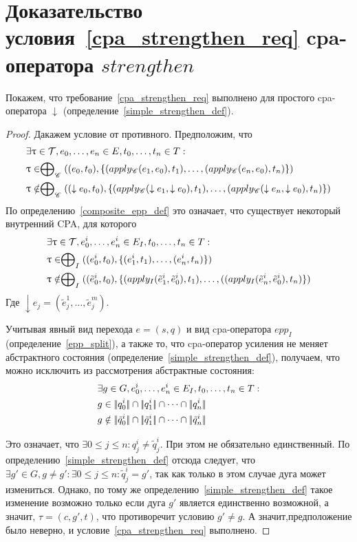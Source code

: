 \section{Доказательство условия~\ref{cpa_strengthen_req} cpa-оператора $strengthen$}
\label{sect_composite_strengthen_proof}

Покажем, что требование~\ref{cpa_strengthen_req} выполнено для простого cpa-оператора $\downarrow$ (определение~\ref{simple_strengthen_def}).

\begin{proof}
Дакажем условие от противного.
Предположим, что 
\begin{align*}
& \exists \uptau \in \mathcal{T}, e_0, \dots, e_n \in E, t_0, \dots, t_n \in T : \\
& \uptau \in \mathrel{\bigoplus}_{\mathscr{C}}((e_0, t_0), \{(apply_{\mathscr{C}}(e_1, e_0), t_1), \dots, (apply_{\mathscr{C}}(e_n, e_0), t_n)\}) \\
& \uptau \notin \mathrel{\bigoplus}_{\mathscr{C}}((\downarrow e_0, t_0), \{(apply_{\mathscr{C}}(\downarrow e_1, \downarrow e_0), t_1), \dots, (apply_{\mathscr{C}}(\downarrow e_n, \downarrow e_0), t_n)\}) 
\end{align*}
По определению~\ref{composite_epp_def} это означает, что существует некоторый внутренний CPA, для которого 
\begin{align*}
& \exists \uptau \in \mathcal{T}, e^i_0, \dots, e^i_n \in E_I, t_0, \dots, t_n \in T : \\
& \uptau \in \mathrel{\bigoplus}_{I}((e^i_0, t_0), \{(e^i_1, t_1), \dots, (e^i_n, t_n)\}) \\
& \uptau \notin \mathrel{\bigoplus}_{I}((\tilde{e}^i_0, t_0), \{(apply_{I}(\tilde{e}^i_1, \tilde{e}^i_0), t_1), \dots, ((apply_{I}(\tilde{e}^i_n, \tilde{e}^i_0), t_n)\}) 
\end{align*}
Где $\downarrow e_j = (\tilde{e}^1_j, \dots, \tilde{e}^m_j)$.

Учитывая явный вид перехода $e=(s,q)$ и вид cpa-оператора $epp_I$(определение~\ref{epp_split}), а также то, что cpa-оператор усиления не меняет абстрактного состояния (определение~\ref{simple_strengthen_def}), получаем, что можно исключить из рассмотрения абстрактные состояния:
\begin{align*}
& \exists g \in G, e^i_0, \dots, e^i_n \in E_I, t_0, \dots, t_n \in T : \\
& g \in \econc{q^i_0} \cap \econc{q^i_1} \cap \dots \cap \econc{q^i_n} \\
& g \notin \econc{\tilde{q}^i_0} \cap \econc{\tilde{q}^i_1} \cap \dots \cap \econc{\tilde{q}^i_n} 
\end{align*}

Это означает, что $\exists 0 \le j \le n: q^i_j \neq \tilde{q}^i_j$. При этом не обязательно единственный.
По определению~\ref{simple_strengthen_def} отсюда следует, что $\exists g' \in G, g \neq g': \exists 0 \le j \le n: \tilde{q}^i_j = g'$, так как только в этом случае дуга может измениться.
Однако, по тому же определению~\ref{simple_strengthen_def} такое изменение возможно только если дуга $g'$ является единственно возможной, а значит, $\tau = (c, g', t)$, что противоречит условию $g' \neq g$. 
А значит,предположение было неверно, и условие~\ref{cpa_strengthen_req} выполнено.
\end{proof}


